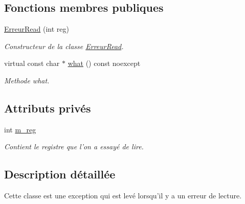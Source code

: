 \subsection*{Fonctions membres publiques}
\begin{DoxyCompactItemize}
\item 
\hyperlink{classCI2C_1_1ErreurRead_a2006046ac1989f7d8f36e73365a7430d}{Erreur\+Read} (int reg)
\begin{DoxyCompactList}\small\item\em Constructeur de la classe \hyperlink{classCI2C_1_1ErreurRead}{Erreur\+Read}. \end{DoxyCompactList}\item 
virtual const char $\ast$ \hyperlink{classCI2C_1_1ErreurRead_a43289e1f3f662de4ee81036a98b2ed55}{what} () const noexcept
\begin{DoxyCompactList}\small\item\em Methode what. \end{DoxyCompactList}\end{DoxyCompactItemize}
\subsection*{Attributs privés}
\begin{DoxyCompactItemize}
\item 
\hypertarget{classCI2C_1_1ErreurRead_a8af2c5a4b9b952aa97537fd2c59745a5}{int \hyperlink{classCI2C_1_1ErreurRead_a8af2c5a4b9b952aa97537fd2c59745a5}{m\+\_\+reg}}\label{classCI2C_1_1ErreurRead_a8af2c5a4b9b952aa97537fd2c59745a5}

\begin{DoxyCompactList}\small\item\em Contient le registre que l'on a essayé de lire. \end{DoxyCompactList}\end{DoxyCompactItemize}


\subsection{Description détaillée}
Cette classe est une exception qui est levé lorsqu'il y a un erreur de lecture. 

